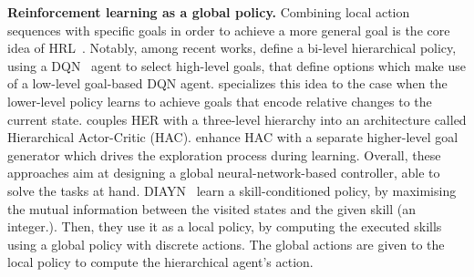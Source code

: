 \textbf{Reinforcement learning as a global policy.}
Combining local action sequences with specific goals in order to achieve a more general goal is the core idea of
HRL~\citep{sutton1999between,precup2000temporal,konidaris2009skill}.
Notably, among recent works, \citet{kulkarni2016hierarchical} define a bi-level hierarchical policy, using a
DQN~\citep{mnih2015human} agent to select high-level goals, that define options which make use of a low-level goal-based
DQN agent.
\citet{nachum2018data} specializes this idea to the case when the lower-level policy learns to achieve goals that
encode relative changes to the current state.
\citet{levy2019learning} couples HER with a three-level hierarchy into an architecture called Hierarchical Actor-Critic
(HAC).
\citet{mcclinton2021hac} enhance HAC with a separate higher-level goal generator which drives the exploration process
during learning.
Overall, these approaches aim at designing a global neural-network-based controller, able to solve the tasks at hand.
DIAYN~\cite{eysenbach2018diversity} learn a skill-conditioned policy, by maximising the mutual information between the 
visited states and the given skill (an integer.).
Then, they use it as a local policy, by computing the executed skills using a global policy with discrete actions.
The global actions are given to the local policy to compute the hierarchical agent's action.


